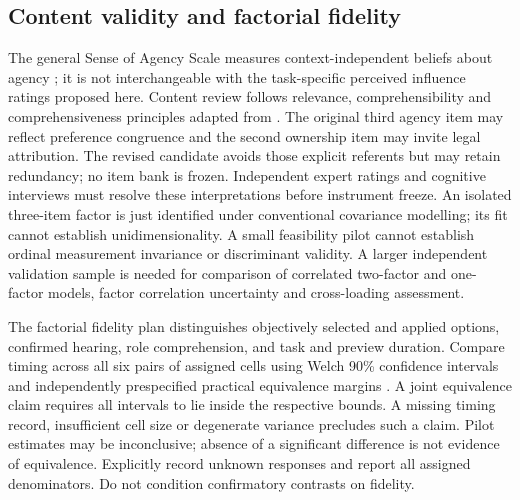 \documentclass[11pt]{article}
\begin{document}
\subsection{Content validity and factorial fidelity}
The general Sense of Agency Scale measures context-independent beliefs about agency \citep{tapal2017}; it is not interchangeable with the task-specific perceived influence ratings proposed here. Content review follows relevance, comprehensibility and comprehensiveness principles adapted from \citet{terwee2018}. The original third agency item may reflect preference congruence and the second ownership item may invite legal attribution. The revised candidate avoids those explicit referents but may retain redundancy; no item bank is frozen. Independent expert ratings and cognitive interviews must resolve these interpretations before instrument freeze. An isolated three-item factor is just identified under conventional covariance modelling; its fit cannot establish unidimensionality. A small feasibility pilot cannot establish ordinal measurement invariance or discriminant validity. A larger independent validation sample is needed for comparison of correlated two-factor and one-factor models, factor correlation uncertainty and cross-loading assessment.
\par The factorial fidelity plan distinguishes objectively selected and applied options, confirmed hearing, role comprehension, and task and preview duration. Compare timing across all six pairs of assigned cells using Welch 90\% confidence intervals and independently prespecified practical equivalence margins \citep{lakens2017}. A joint equivalence claim requires all intervals to lie inside the respective bounds. A missing timing record, insufficient cell size or degenerate variance precludes such a claim. Pilot estimates may be inconclusive; absence of a significant difference is not evidence of equivalence. Explicitly record unknown responses and report all assigned denominators. Do not condition confirmatory contrasts on fidelity.
\end{document}
